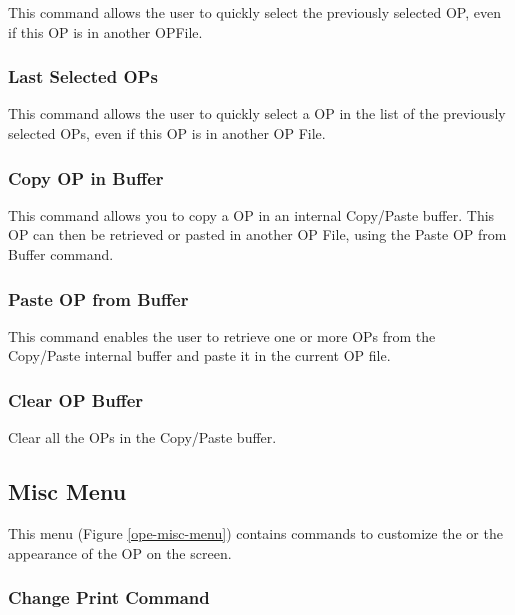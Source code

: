 This command allows the user to quickly select the previously selected OP,
even if this OP is in another OPFile.

\subsubsection{Last Selected OPs}

This command allows the user to quickly select a OP in the list of the
previously selected OPs, even if this OP is in another OP File.

\subsubsection{Copy OP in Buffer}

This command allows you to copy a OP in an internal Copy/Paste buffer.
This OP can then be
retrieved or pasted in another OP File, using the Paste OP from Buffer
command.

\subsubsection{Paste OP from Buffer}

This command enables the user to retrieve one or more OPs from the
Copy/Paste
internal buffer and paste it in the current OP file.

\subsubsection{Clear OP Buffer}

Clear all the OPs in the Copy/Paste buffer.

\subsection{Misc Menu}


This menu (Figure \ref{ope-misc-menu}) contains commands to customize the \OPE{} or the appearance of
the OP on the screen.



\subsubsection{Change Print Command}

